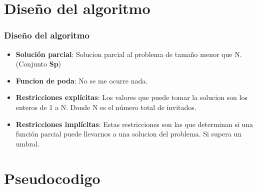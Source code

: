 \documentclass{beamer}
\begin{document}
\section{Diseño del algoritmo} 
\begin{frame}
	\frametitle{Diseño del algoritmo}
	\begin{itemize}
		\item \textbf{Solución parcial}: Solucion parcial al problema de tamaño menor que N. (Conjunto \textbf{Sp})
		\item \textbf{Funcion de poda}: No se me ocurre nada.
		\item \textbf{Restricciones explícitas}: Los valores que puede tomar la solucion son los enteros de 1 a N. Donde N es el número total de invitados.  
		\item \textbf{Restricciones implícitas}: Estas restricciones son las que determinan si una función parcial puede llevarnos a una solucion del problema. Si supera un umbral.  
	\end{itemize}
	
\end{frame}

\section{Pseudocodigo}
\begin{frame}

	
\end{frame}
\end{document}
